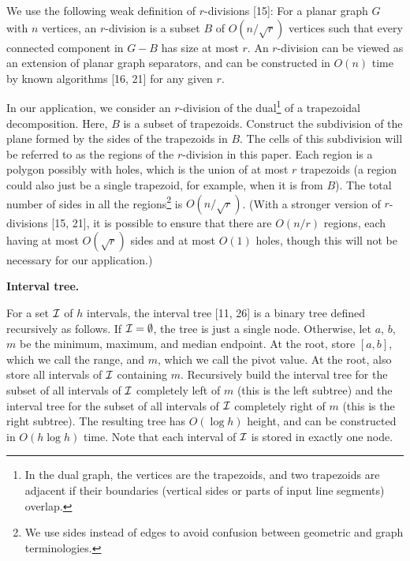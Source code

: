 \documentclass[10pt,a4paper]{article}
\begin{document}
We use the following weak definition of $r$-divisions [15]: For a planar graph $G$ with $n$ vertices, an $r$-division is a subset $B$ of $O(n/\sqrt{r})$ vertices such that every connected component in $G-B$ has size at most $r$. An $r$-division can be viewed as an extension of planar graph separators, and can be constructed in $O(n)$ time by known algorithms [16, 21] for any given $r$.
\par
\par
In our application, we consider an $r$-division of the dual\footnote{In the dual graph, the vertices are the trapezoids, and two trapezoids are adjacent if their boundaries (vertical sides or parts of input line segments) overlap.} of a trapezoidal decomposition. Here, $B$ is a subset of trapezoids. Construct the subdivision of the plane formed by the sides of the trapezoids in $B$. The cells of this subdivision will be referred to as the regions of the $r$-division in this paper. Each region is a polygon possibly with holes, which is the union of at most $r$ trapezoids (a region could also just be a single trapezoid, for example, when it is from $B$). The total number of sides in all the regions\footnote{We use sides instead of edges to avoid confusion between geometric and graph terminologies. } is $O(n/\sqrt{r})$. (With a stronger version of $r$-divisions [15, 21], it is possible to ensure that there are $O(n/r)$ regions, each having at most $O(\sqrt{r})$ sides and at most $O(1)$ holes, though this will not be necessary for our application.)
\par
\par
\par\medskip\noindent\textbf{Interval tree.}\par
For a set ${\cal I}$ of $h$ intervals, the interval tree [11, 26] is a binary tree defined recursively as follows. If ${\cal I}=\emptyset$, the tree is just a single node. Otherwise, let $a$, $b$, $m$ be the minimum, maximum, and median endpoint. At the root, store $[a,b]$, which we call the range, and $m$, which we call the pivot value. At the root, also store all intervals of ${\cal I}$ containing $m$. Recursively build the interval tree for the subset of all intervals of ${\cal I}$ completely left of $m$ (this is the left subtree) and the interval tree for the subset of all intervals of ${\cal I}$ completely right of $m$ (this is the right subtree). The resulting tree has $O(\log h)$ height, and can be constructed in $O(h\log h)$ time. Note that each interval of ${\cal I}$ is stored in exactly one node.
\end{document}

